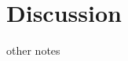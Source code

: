 \documentclass[12pt]{article}
\newcommand{\afbcomment}[1]{\textcolor{alexcolor}{#1}}
\newcommand{\afbquestion}[1]{\textcolor{alexquestioncolor}{#1}}
\begin{document}
\section*{Discussion}
\afbcomment{
other notes
\begin{itemize}

\end{itemize}}
\end{document}
